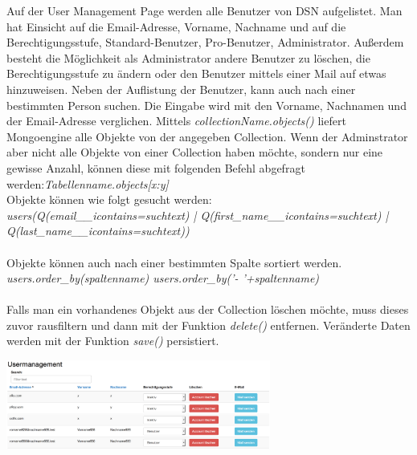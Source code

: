 Auf der User Management Page werden alle Benutzer von DSN aufgelistet. Man hat Einsicht auf die Email-Adresse, Vorname, Nachname und auf die Berechtigungsstufe, Standard-Benutzer, Pro-Benutzer, Administrator. Außerdem besteht die Möglichkeit als Administrator andere Benutzer zu löschen, die Berechtigungsstufe zu ändern oder den Benutzer mittels einer Mail auf etwas hinzuweisen. Neben der Auflistung der Benutzer, kann auch nach einer bestimmten Person suchen. Die Eingabe wird mit den Vorname, Nachnamen und der Email-Adresse verglichen. Mittels \textit{collectionName.objects()} liefert Mongoengine alle Objekte von der angegeben Collection. Wenn der Adminstrator aber nicht alle Objekte von einer Collection haben möchte, sondern nur eine gewisse Anzahl, können diese mit folgenden Befehl abgefragt werden:\textit{Tabellenname.objects[x:y]}\\
Objekte können wie folgt gesucht werden:\\
\textit{users(Q(email\_\_icontains=suchtext) \big| Q(first\_name\_\_icontains=suchtext) \big|\\
Q(last\_name\_\_icontains=suchtext))}\\
\\
Objekte können auch nach einer bestimmten Spalte sortiert werden.\\
\textit{users.order\_by(spaltenname)
users.order\_by('- '+spaltenname)}\\
\\
Falls man ein vorhandenes Objekt aus der Collection löschen möchte, muss dieses zuvor rausfiltern und dann mit der Funktion \textit{delete()} entfernen. Veränderte Daten werden mit der Funktion \textit{save()} persistiert.

\includegraphics[width=0.65\textwidth]{images/usermanagement/Usermanagment}\\

